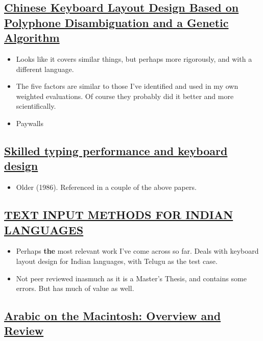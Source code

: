 \documentclass[11pt]{article}
\begin{document}
\subsection{\href{https://www.tandfonline.com/doi/abs/10.1080/10447318.2013.777827}{Chinese Keyboard Layout Design Based on Polyphone Disambiguation and a Genetic Algorithm}}
\label{sec:org5c77330}

\begin{itemize}
\item Looks like it covers similar things, but perhaps more rigorously, and with a different language.
\item The five factors are similar to those I've identified and used in my own weighted evaluations. Of course they probably did it better and more scientifically.
\item Paywalls
\end{itemize}

\subsection{\href{https://link.springer.com/article/10.1007\%2FBF02686608}{Skilled typing performance and keyboard design}}
\label{sec:orge5c538f}

\begin{itemize}
\item Older (1986). Referenced in a couple of the above papers.
\end{itemize}

\subsection{\href{https://researchweb.iiit.ac.in/\~sowmya\_vb/msthesis.pdf}{TEXT INPUT METHODS FOR INDIAN LANGUAGES}}
\label{sec:orga64789d}

\begin{itemize}
\item Perhaps \textbf{the} most relevant work I've come across so far. Deals with keyboard layout design for Indian languages, with Telugu as the test case.
\item Not peer reviewed inasmuch as it is a Master's Thesis, and contains some errors. But has much of value as well.
\end{itemize}

\subsection{\href{https://www.jstor.org/stable/23063782}{Arabic on the Macintosh: Overview and Review}}
\label{sec:org5462cb8}
\end{document}
